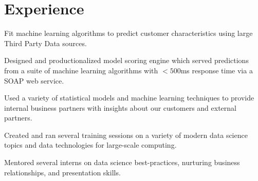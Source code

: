 \documentclass[letterpaper]{deedy-resume} %
\begin{document}
\hfill
%
%
\begin{minipage}[t]{0.63\textwidth} %


\section{Experience}
\vspace{\topsep}
\begin{tightitemize}
\item Fit machine learning algorithms to predict customer characteristics using
  large Third Party Data sources.
\item Designed and productionalized model scoring engine which 
  served predictions from a suite of machine learning algorithms with $<500$ms response time
  via a SOAP web service.
\item Used a variety of statistical models and machine learning techniques to
  provide internal business partners with insights about our customers and
  external partners.
\item Created and ran several training sessions on a variety of modern data
  science topics and data technologies for large-scale computing.
\item Mentored several interns on data science best-practices, nurturing
  business relationships, and presentation skills.
\end{tightitemize}
\sectionspace


\end{minipage}
\end{document}
